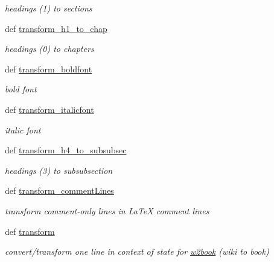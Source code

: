 \begin{DoxyCompactItemize}
\begin{DoxyCompactList}\small\item\em headings (1) to sections \end{DoxyCompactList}\item 
def \hyperlink{namespaceuicilibris_1_1transform2book_a0d2c1293746df981fc363524dc7ad52b}{transform\-\_\-h1\-\_\-to\-\_\-chap}
\begin{DoxyCompactList}\small\item\em headings (0) to chapters \end{DoxyCompactList}\item 
def \hyperlink{namespaceuicilibris_1_1transform2book_a06a595b9bc4a1663231d6574fddb5434}{transform\-\_\-boldfont}
\begin{DoxyCompactList}\small\item\em bold font \end{DoxyCompactList}\item 
def \hyperlink{namespaceuicilibris_1_1transform2book_a8231118733f161fddf437e2045f789af}{transform\-\_\-italicfont}
\begin{DoxyCompactList}\small\item\em italic font \end{DoxyCompactList}\item 
def \hyperlink{namespaceuicilibris_1_1transform2book_a16a30bedfcd3efb8de8104471a959b52}{transform\-\_\-h4\-\_\-to\-\_\-subsubsec}
\begin{DoxyCompactList}\small\item\em headings (3) to subsubsection \end{DoxyCompactList}\item 
def \hyperlink{namespaceuicilibris_1_1transform2book_a969020c6558588101c875d7c65e8b768}{transform\-\_\-comment\-Lines}
\begin{DoxyCompactList}\small\item\em transform comment-\/only lines in \-La\-Te\-X comment lines \end{DoxyCompactList}\item 
def \hyperlink{namespaceuicilibris_1_1transform2book_aa875aed0b73e352b8524d65ff86ce35f}{transform}
\begin{DoxyCompactList}\small\item\em convert/transform one line in context of state for \hyperlink{namespaceuicilibris_1_1w2book}{w2book} (wiki to book) \end{DoxyCompactList}\end{DoxyCompactItemize}


